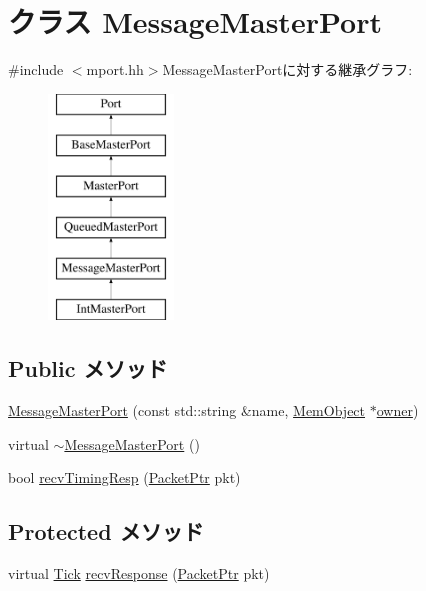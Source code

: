 \hypertarget{classMessageMasterPort}{
\section{クラス MessageMasterPort}
\label{classMessageMasterPort}
}


{\ttfamily \#include $<$mport.hh$>$}MessageMasterPortに対する継承グラフ:\begin{figure}[H]
\begin{center}
\leavevmode
\includegraphics[height=6cm]{classMessageMasterPort}
\end{center}
\end{figure}
\subsection*{Public メソッド}
\begin{DoxyCompactItemize}
\item 
\hyperlink{classMessageMasterPort_a6de9d9e9415eba856e517eade3e594a4}{MessageMasterPort} (const std::string \&name, \hyperlink{classMemObject}{MemObject} $\ast$\hyperlink{classPort_aba966efb6c1df4b015be3a396df6c318}{owner})
\item 
virtual \hyperlink{classMessageMasterPort_ab01c989cee75a49762e58a658c890528}{$\sim$MessageMasterPort} ()
\item 
bool \hyperlink{classMessageMasterPort_a482dba5588f4bee43e498875a61e5e0b}{recvTimingResp} (\hyperlink{classPacket}{PacketPtr} pkt)
\end{DoxyCompactItemize}
\subsection*{Protected メソッド}
\begin{DoxyCompactItemize}
\item 
virtual \hyperlink{base_2types_8hh_a5c8ed81b7d238c9083e1037ba6d61643}{Tick} \hyperlink{classMessageMasterPort_ae473b2a0c55e73359b9643810869ca81}{recvResponse} (\hyperlink{classPacket}{PacketPtr} pkt)
\end{DoxyCompactItemize}
